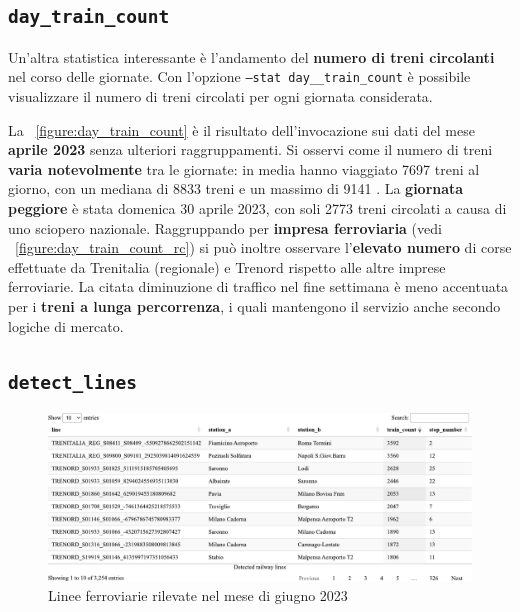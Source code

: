 \documentclass[12pt,a4paper,italian]{report}
\begin{document}
\subsection{\texttt{day\_train\_count}}
\label{stat_day_train_count}

Un'altra statistica interessante è l'andamento del \textbf{numero di
    treni circolanti} nel corso delle giornate.  Con l'opzione
\texttt{--stat day\_\-\_train\_\-count} è possibile visualizzare il
numero di treni circolati per ogni giornata considerata.

La \figurename~\ref{figure:day_train_count} è il risultato
dell'invocazione sui dati del mese \textbf{aprile 2023} senza
ulteriori raggruppamenti.  Si osservi come il numero di treni
\textbf{varia notevolmente} tra le giornate: in media hanno viaggiato
7697 treni al giorno, con un mediana di 8833 treni e un massimo di
9141 \cite[D]{StatJup}.  La \textbf{giornata peggiore} è stata
domenica 30 aprile 2023, con soli 2773 treni circolati a causa di uno
sciopero nazionale.  Raggruppando per \textbf{impresa ferroviaria}
(vedi \figurename~\ref{figure:day_train_count_rc}) si può inoltre
osservare l'\textbf{elevato numero} di corse effettuate da Trenitalia
(regionale) e Trenord rispetto alle altre imprese ferroviarie.  La
citata diminuzione di traffico nel fine settimana è meno accentuata
per i \textbf{treni a lunga percorrenza}, i quali mantengono il
servizio anche secondo logiche di mercato.

\subsection{\texttt{detect\_lines}}

\begin{figure}[h]
    \includegraphics[width=1\textwidth]{images/detect_lines.pdf}
    \caption{Linee ferroviarie rilevate nel mese di giugno 2023}
    \label{figure:detect_lines}
\end{figure}
\end{document}
